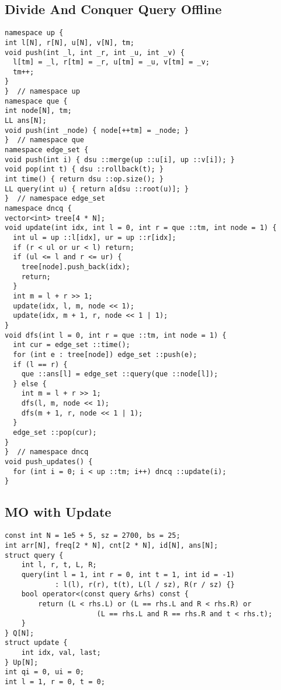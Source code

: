 \documentclass[FSZ,a4paper,onesided]{article}
\begin{document}
\begin{multicols*}{\COLS}
\subsection{Divide And Conquer Query Offline}
\begin{lstlisting}
namespace up {
int l[N], r[N], u[N], v[N], tm;
void push(int _l, int _r, int _u, int _v) {
  l[tm] = _l, r[tm] = _r, u[tm] = _u, v[tm] = _v;
  tm++;
}
}  // namespace up
namespace que {
int node[N], tm;
LL ans[N];
void push(int _node) { node[++tm] = _node; }
}  // namespace que
namespace edge_set {
void push(int i) { dsu ::merge(up ::u[i], up ::v[i]); }
void pop(int t) { dsu ::rollback(t); }
int time() { return dsu ::op.size(); }
LL query(int u) { return a[dsu ::root(u)]; }
}  // namespace edge_set
namespace dncq {
vector<int> tree[4 * N];
void update(int idx, int l = 0, int r = que ::tm, int node = 1) {
  int ul = up ::l[idx], ur = up ::r[idx];
  if (r < ul or ur < l) return;
  if (ul <= l and r <= ur) {
    tree[node].push_back(idx);
    return;
  }
  int m = l + r >> 1;
  update(idx, l, m, node << 1);
  update(idx, m + 1, r, node << 1 | 1);
}
void dfs(int l = 0, int r = que ::tm, int node = 1) {
  int cur = edge_set ::time();
  for (int e : tree[node]) edge_set ::push(e);
  if (l == r) {
    que ::ans[l] = edge_set ::query(que ::node[l]);
  } else {
    int m = l + r >> 1;
    dfs(l, m, node << 1);
    dfs(m + 1, r, node << 1 | 1);
  }
  edge_set ::pop(cur);
}
}  // namespace dncq
void push_updates() {
  for (int i = 0; i < up ::tm; i++) dncq ::update(i);
}
\end{lstlisting}
\subsection{MO with Update}
\begin{lstlisting}
const int N = 1e5 + 5, sz = 2700, bs = 25;
int arr[N], freq[2 * N], cnt[2 * N], id[N], ans[N];
struct query {
    int l, r, t, L, R;
    query(int l = 1, int r = 0, int t = 1, int id = -1)
            : l(l), r(r), t(t), L(l / sz), R(r / sz) {}
    bool operator<(const query &rhs) const {
        return (L < rhs.L) or (L == rhs.L and R < rhs.R) or
                      (L == rhs.L and R == rhs.R and t < rhs.t);
    }
} Q[N];
struct update {
    int idx, val, last;
} Up[N];
int qi = 0, ui = 0;
int l = 1, r = 0, t = 0;


\end{lstlisting}
\end{multicols*}
\end{document}
